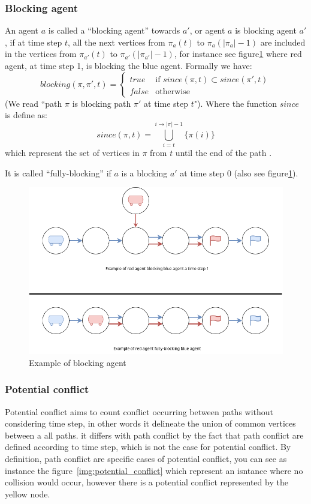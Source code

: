 \subsubsection{Blocking agent}\label{def:blocking_agent}
  An agent \(a\) is called a ``blocking agent'' towards \(a'\), or agent \(a\) is blocking agent \(a'\), if at time step \(t\), all the next vertices from \(\pi_a(t)\) to \(\pi_a(|\pi_a|-1)\) are included in the vertices from \(\pi_{a'}(t)\) to \(\pi_{a'}(|\pi_{a'}|-1)\), for instance see figure\ref{img:blocking_agent} where red agent, at time step 1, is blocking the blue agent. Formally we have: \
  \[
    blocking(\pi,\pi',t) = \begin{cases}
      true   & \text{if }  since(\pi,t) \subset  since(\pi',t) \\
      false  & \text{otherwise}
    \end{cases}
  \] (We read ``path \(\pi\) is blocking path \(\pi'\) at time step \(t\)"). Where the function \(since\) is define as:
  \[
    since(\pi,t) = \bigcup_{i=t}^{i \rightarrow |\pi|-1} \{\pi(i)\}  
  \] which represent the set of vertices in \(\pi\) from \(t\) until the end of the path .
  
  It is called  ``fully-blocking''  if  \(a\) is a blocking \(a'\) at time step 0 (also see figure\ref{img:blocking_agent}). 
\begin{figure}[H]
  \centering
  \caption{Example of blocking agent}\label{img:blocking_agent}
  \includegraphics[width=\widthimg]{img/blocking_agent.drawio.png}
\end{figure}



\subsubsection{Potential conflict}
Potential conflict aims to count conflict occurring between paths without considering time step, in other words it delineate the union of common vertices between a all paths. it differs with path conflict by the fact that path conflict are defined according to time step, which is not the case for potential conflict. By definition, path conflict are specific cases of potential conflict, you can see as instance the figure~\ref{img:potential_conflict} which represent an isntance where no collision would occur, however there is a potential conflict represented by the yellow node. 


